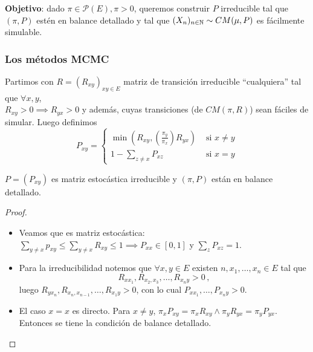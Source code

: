 \newp \textbf{Objetivo}: dado $\pi\in\mathcal{P}(E),\pi>0$, queremos construir $P$ irreducible tal que $(\pi,P)$ estén en balance detallado y tal que $(X_n)_{n\in\mathbb{N}}\sim CM(\mu,P)$ es fácilmente simulable.
\subsubsection{Los métodos MCMC}
Partimos con $R=(R_{xy})_{xy\in E}$ matriz de transición irreducible ``cualquiera'' tal que $\forall x,y$,\\ $R_{xy}>0\implies R_{yx}>0$ y además, cuyas transiciones (de $CM(\pi,R)$) sean fáciles de simular.
\newline Luego definimos
$$ P_{xy}=\begin{cases}
\min(R_{xy},(\frac{\pi_y}{\pi_x})R_{yx})  & \mbox{ si }x\neq y\\
1-\displaystyle\sum_{z\neq x}P_{xz}  & \mbox{ si }x=y
\end{cases}$$
\begin{proposition}
$P=(P_{xy})$ es matriz estocástica irreducible y $(\pi,P)$ están en balance detallado.
\end{proposition}
\begin{proof}
\gris
\beforeitemize
\begin{itemize}
    \item Veamos que es matriz estocástica: $\sum_{y\neq x}p_{xy}\leq \sum_{y\neq x}R_{xy}\leq 1 \implies P_{xx}\in[0,1]$ y $\sum_z P_{xz}=1$.
    \item Para la irreducibilidad notemos que $\forall x,y\in E$ existen $n,x_1,\dots,x_n\in E$ tal que 
    $$R_{xx_1},R_{x_2,x_3},\dots,R_{x_ny}>0\,,$$
    luego $R_{yx_n},R_{x_n,x_{n-1}},\dots,R_{x_1y}>0$, con lo cual $P_{xx_1},\dots,P_{x_ny}>0$.
    \item El caso $x=x$ es directo. Para $x\neq y$, $\pi_xP_{xy}=\pi_xR_{xy}\land \pi_yR_{yx}=\pi_yP_{yx}$. \\ Entonces se tiene la condición de balance detallado.
\end{itemize}
\findem
\negro
\end{proof}

